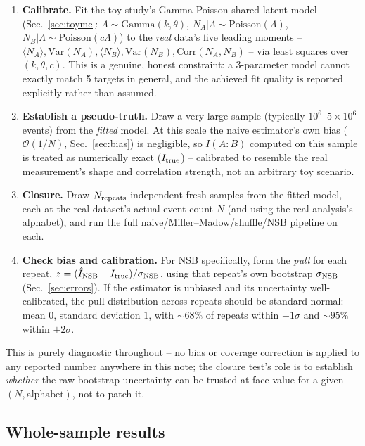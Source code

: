 \documentclass[11pt]{article}
\begin{document}
\begin{enumerate}
\item \textbf{Calibrate.} Fit the toy study's Gamma-Poisson shared-latent
model (Sec.~\ref{sec:toymc}: $\Lambda\sim\mathrm{Gamma}(k,\theta)$,
$N_A|\Lambda\sim\mathrm{Poisson}(\Lambda)$,
$N_B|\Lambda\sim\mathrm{Poisson}(c\Lambda)$) to the \emph{real} data's
five leading moments -- $\langle N_A\rangle,\mathrm{Var}(N_A),
\langle N_B\rangle,\mathrm{Var}(N_B),\mathrm{Corr}(N_A,N_B)$ -- via
least squares over $(k,\theta,c)$. This is a genuine, honest constraint:
a 3-parameter model cannot exactly match 5 targets in general, and the
achieved fit quality is reported explicitly rather than assumed.
\item \textbf{Establish a pseudo-truth.} Draw a very large sample
(typically $10^6$--$5\times10^6$ events) from the \emph{fitted} model.
At this scale the naive estimator's own bias
($\mathcal{O}(1/N)$, Sec.~\ref{sec:bias}) is negligible, so $I(A{:}B)$
computed on this sample is treated as numerically exact
($I_{\rm true}$) -- calibrated to resemble the real measurement's shape
and correlation strength, not an arbitrary toy scenario.
\item \textbf{Closure.} Draw $N_{\rm repeats}$ independent fresh samples
from the fitted model, each at the real dataset's actual event count $N$
(and using the real analysis's alphabet), and run the full
naive/Miller--Madow/shuffle/NSB pipeline on each.
\item \textbf{Check bias and calibration.} For NSB specifically, form the
\emph{pull} for each repeat,
$z = (\hat I_{\rm NSB}-I_{\rm true})/\sigma_{\rm NSB}$,
using that repeat's own bootstrap $\sigma_{\rm NSB}$
(Sec.~\ref{sec:errors}). If the estimator is unbiased and its uncertainty
well-calibrated, the pull distribution across repeats should be standard
normal: mean $0$, standard deviation $1$, with $\sim\!68\%$ of repeats
within $\pm1\sigma$ and $\sim\!95\%$ within $\pm2\sigma$.
\end{enumerate}
This is purely diagnostic throughout -- no bias or coverage correction is
applied to any reported number anywhere in this note; the closure test's
role is to establish \emph{whether} the raw bootstrap uncertainty can be
trusted at face value for a given $(N,\text{alphabet})$, not to patch it.

\subsection{Whole-sample results}
\label{sec:closure-results}
\end{document}
